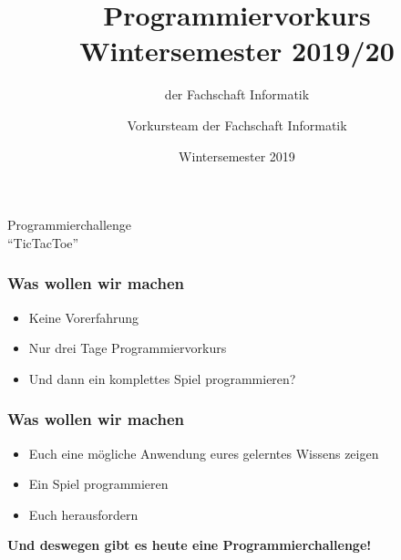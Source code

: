 
\usepackage{float}
\usepackage{listings}
\usepackage{graphicx}
\usepackage{epstopdf}
\usepackage{wrapfig}

\title[Programmiervorkurs]{Programmiervorkurs Wintersemester 2019/20}
\subtitle{{\small der Fachschaft Informatik}}
\author{Vorkursteam der Fachschaft Informatik}
\date{Wintersemester 2019}




\begin{frame}
    \begin{center}
        \vspace{2cm}
        {\huge Programmierchallenge \\ "`TicTacToe"'}
    \end{center}
\end{frame}


\begin{frame}
    \frametitle{Was wollen wir machen}
    \begin{itemize}
        \item Keine Vorerfahrung
        \item Nur drei Tage Programmiervorkurs
        \item Und dann ein komplettes Spiel programmieren?
    \end{itemize}
\end{frame}


\begin{frame}
    \frametitle{Was wollen wir machen}
    \begin{itemize}
        \item Euch eine mögliche Anwendung eures gelerntes Wissens zeigen
        \item Ein Spiel programmieren
        \item Euch herausfordern
    \end{itemize}
    \vspace{6mm}
    \begin{center}
        \textbf{\huge Und deswegen gibt es heute eine Programmierchallenge!}
    \end{center}

\end{frame}



